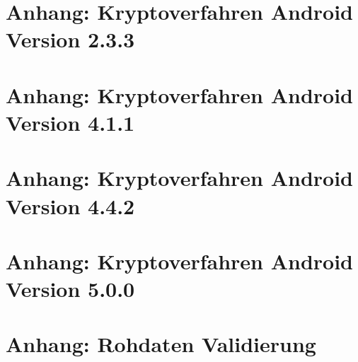 \documentclass[10pt, a4paper,headsepline]{scrreprt}
\begin{document}






\chapter{Anhang: Kryptoverfahren Android Version 2.3.3}


\chapter{Anhang: Kryptoverfahren Android Version 4.1.1}


\chapter{Anhang: Kryptoverfahren Android Version 4.4.2}


\chapter{Anhang: Kryptoverfahren Android Version 5.0.0}


\chapter{Anhang: Rohdaten Validierung}











\end{document}
